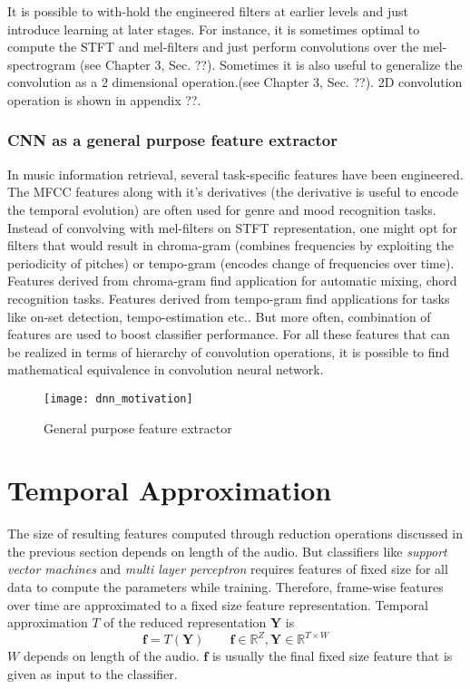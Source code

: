 \FloatBarrier
\noindent It is possible to with-hold the engineered filters at earlier levels and just introduce learning at later stages. For instance, it is sometimes optimal to compute the STFT and mel-filters and just perform convolutions over the mel-spectrogram\cite{EndToEnd}\cite{choi_cnn} (see Chapter 3, Sec. ??). Sometimes it is also useful to generalize the convolution as a 2 dimensional operation\cite{MusicMotive}.(see Chapter 3, Sec. ??). 2D convolution operation is shown in appendix ??. 

\subsubsection{CNN as a general purpose feature extractor}  
\label{general}
In music information retrieval, several task-specific features have been engineered. The MFCC features along with it's derivatives (the derivative is useful to encode the temporal evolution) are often used for genre and mood recognition tasks. Instead of convolving with mel-filters on STFT representation, one might opt for filters that would result in chroma-gram (combines frequencies by exploiting the periodicity of pitches) or tempo-gram (encodes change of frequencies over time). Features derived from chroma-gram find application for automatic mixing, chord recognition tasks. Features derived from tempo-gram find applications for tasks like on-set detection, tempo-estimation etc.. But more often, combination of features are used to boost classifier performance. For all these features that can be realized in terms of hierarchy of convolution operations, it is possible to find mathematical equivalence in convolution neural network.     

\begin{figure}[h] 
\centering
\texttt{[image: dnn\_motivation]}
\caption{General purpose feature extractor}
 \label{fig:deep learning}
 \end{figure}
\FloatBarrier
\bigskip

\section{Temporal Approximation}
\label{temporal}
The size of resulting features computed through reduction operations discussed in the previous section depends on length of the audio. But classifiers like \textit{support vector machines} and \textit{multi layer perceptron} requires features of fixed size for all data to compute the parameters while training. Therefore, frame-wise features over time are approximated to a fixed size feature representation. Temporal approximation $T$ of the reduced representation $\textbf{Y}$ is  
\[
\textbf{f} = T(\textbf{Y}) \qquad \textbf{f} \in \mathbb{R}^{Z}, \textbf{Y} \in \mathbb{R}^{T \times W}
\]
$W$ depends on length of the audio. $\textbf{f}$ is usually the final fixed size feature that is given as input to the classifier.  
\bigskip

